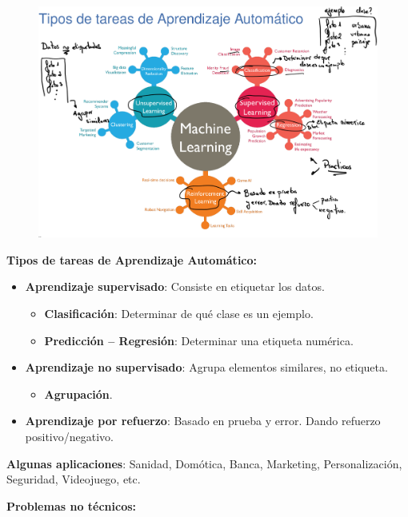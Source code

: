 \documentclass[12pt, twoside, openright]{report} %
\begin{document}
\begin{figure}[H]
	{\includegraphics[scale=.2]{Untitled 2.png}}
\end{figure}
\pagebreak
\textbf{Tipos de tareas de Aprendizaje Automático:}
\begin{itemize}
	\item \textbf{Aprendizaje supervisado}: Consiste en etiquetar los datos.

	      \begin{itemize}
		      \item \textbf{Clasificación}: Determinar de qué clase es un ejemplo.
		      \item \textbf{Predicción -- Regresión}: Determinar una etiqueta numérica.

	      \end{itemize}
	\item \textbf{Aprendizaje no supervisado}: Agrupa elementos similares, no
	      etiqueta.

	      \begin{itemize}
		      \item \textbf{Agrupación}.
	      \end{itemize}
	\item \textbf{Aprendizaje por refuerzo}: Basado en prueba y error. Dando
	      refuerzo positivo/negativo.
\end{itemize}

\textbf{Algunas aplicaciones}: Sanidad, Domótica, Banca, Marketing,
Personalización, Seguridad, Videojuego, etc.

\textbf{Problemas no técnicos:}
\end{document}

